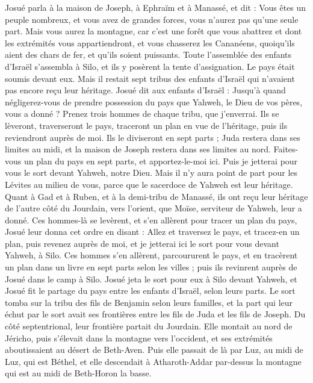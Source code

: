 \begin{multicols}{2}
Josué parla à la maison de Joseph, à Ephraïm et à Manassé, et dit : Vous êtes un peuple nombreux, et vous avez de grandes forces, vous n’aurez pas qu’une seule part.
Mais vous aurez la montagne, car c’est une forêt que vous abattrez et dont les extrémités vous appartiendront, et vous chasserez les Cananéens, quoiqu’ils aient des chars de fer, et qu’ils soient puissants.
\VerseOne{}Toute l’assemblée des enfants d’Israël s’assembla à\FTNT{} Silo, et ils y posèrent la tente d’assignation. Le pays était soumis devant eux.
Mais il restait sept tribus des enfants d’Israël qui n’avaient pas encore reçu leur héritage.
Josué dit aux enfants d’Israël : Jusqu’à quand négligerez-vous de prendre possession du pays que Yahweh, le Dieu de vos pères, vous a donné ?
Prenez trois hommes de chaque tribu, que j’enverrai. Ils se lèveront, traverseront le pays, traceront un plan en vue de l’héritage, puis ils reviendront auprès de moi.
Ils le diviseront en sept parts ; Juda restera dans ses limites au midi, et la maison de Joseph restera dans ses limites au nord.
Faites-vous un plan du pays en sept parts, et apportez-le-moi ici. Puis je jetterai pour vous le sort devant Yahweh, notre Dieu.
Mais il n’y aura point de part pour les Lévites au milieu de vous, parce que le sacerdoce de Yahweh est leur héritage. Quant à Gad et à Ruben, et à la demi-tribu de Manassé, ils ont reçu leur héritage de l’autre côté du Jourdain, vers l’orient, que Moïse, serviteur de Yahweh, leur a donné.
Ces hommes-là se levèrent, et s’en allèrent pour tracer un plan du pays, Josué leur donna cet ordre en disant : Allez et traversez le pays, et tracez-en un plan, puis revenez auprès de moi, et je jetterai ici le sort pour vous devant Yahweh, à Silo.
Ces hommes s’en allèrent, parcoururent le pays, et en tracèrent un plan dans un livre en sept parts selon les villes ; puis ils revinrent auprès de Josué dans le camp à Silo.
Josué jeta le sort pour eux à Silo devant Yahweh, et Josué fit le partage du pays entre les enfants d’Israël, selon leurs parts.
Le sort tomba sur la tribu des fils de Benjamin selon leurs familles, et la part qui leur échut par le sort avait ses frontières entre les fils de Juda et les fils de Joseph.
Du côté septentrional, leur frontière partait du Jourdain. Elle montait au nord de Jéricho, puis s’élevait dans la montagne vers l’occident, et ses extrémités aboutissaient au désert de Beth-Aven.
Puis elle passait de là par Luz, au midi de Luz, qui est Béthel, et elle descendait à Atharoth-Addar par-dessus la montagne qui est au midi de Beth-Horon la basse.

\end{multicols}
